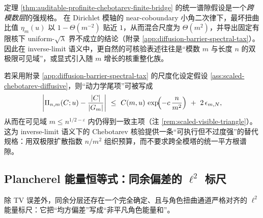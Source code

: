 \begin{remark}\label{rem:chebotarev-diffusion-barrier}
定理 \ref{thm:auditable-profinite-chebotarev-finite-bridge} 的统一谱隙假设是一个\emph{跨模数层}的强规格。
在 Dirichlet 模轴的 near-coboundary 小角二次律下，最坏扭曲比值 \(\eta_m(u)\) 以 \(1-\Theta(m^{-2})\) 贴近 \(1\)，从而混合尺度为 \(\Theta(m^2)\)，并导出固定有限核下 uniform-\(\sqrt{\lambda}\) 界不成立的结论（附录 \ref{app:diffusion-barrier-spectral-tax}）。
因此在 inverse-limit 语义中，更自然的可核验表述往往是“模数 \(m\) 与长度 \(n\) 的双极限可见域”，或显式引入随 \(m\) 增长的核重整化族。
\end{remark}

\begin{remark}\label{rem:chebotarev-scaled-visible}
若采用附录 \ref{app:diffusion-barrier-spectral-tax} 的尺度化设定假设 \ref{ass:scaled-chebotarev-diffusive}，则“动力学尾项”可被写成
$$
\left|\Pi_{n,m}(C;u)-\frac{|C|}{|G_m|}\right|
\ \le\
C(m,u)\,\exp\!\Bigl(-c\,\frac{n}{m^2}\Bigr)\ +\ 2\,\epsilon_{m,N},
$$
从而在可见域 \(m\le n^{1/2-\varepsilon}\) 内仍得到一致主项（注 \ref{rem:scaled-visible-triangle}）。
这为 inverse-limit 语义下的 Chebotarev 核验提供一条“可执行但不过度强”的替代规格：用双极限扩散指数 \(n/m^2\) 组织预算，而不要求跨全模塔的统一平方根谱隙。
\end{remark}

\subsection{Plancherel 能量恒等式：同余偏差的 \texorpdfstring{$\ell^2$}{l2} 标尺}\label{subsec:chebotarev-plancherel}
除 TV 误差外，同余分层还存在一个完全确定、且与角色扭曲通道严格对齐的 \(\ell^2\) 能量标尺：它把“均方偏差”写成“非平凡角色能量和”。

